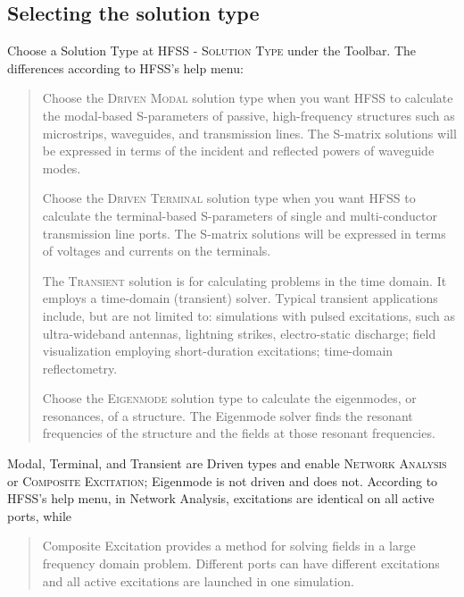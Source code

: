 \documentclass[11pt]{article}
\begin{document}

\subsection{Selecting the solution type}

Choose a Solution Type at \textsc{HFSS - Solution Type} under the Toolbar. The differences according to HFSS's help menu:

\blockquote{Choose the \textsc{Driven Modal} solution type when you want HFSS to calculate the modal-based S-parameters of passive, high-frequency structures such as microstrips, waveguides, and transmission lines. The S-matrix solutions will be expressed in terms of the incident and reflected powers of waveguide modes. 

Choose the \textsc{Driven Terminal} solution type when you want HFSS to calculate the terminal-based S-parameters of single and multi-conductor transmission line ports. The S-matrix solutions will be expressed in terms of voltages and currents on the terminals. %

The \textsc{Transient} solution is for calculating problems in the time domain. It employs a time-domain (transient) solver. Typical transient applications include, but are not limited to: simulations with pulsed excitations, such as ultra-wideband antennas, lightning strikes, electro-static discharge; field visualization employing short-duration excitations; time-domain reflectometry.

Choose the \textsc{Eigenmode} solution type to calculate the eigenmodes, or resonances, of a structure. The Eigenmode solver finds the resonant frequencies of the structure and the fields at those resonant frequencies.}

Modal, Terminal, and Transient are Driven types and enable \textsc{Network Analysis} or \textsc{Composite Excitation}; Eigenmode is not driven and does not. According to HFSS's help menu, in Network Analysis, excitations are identical on all active ports, while

\blockquote{Composite Excitation provides a method for solving fields in a large frequency domain problem. Different ports can have different excitations and all active excitations are launched in one simulation.}

\begin{comment}
Quote HFSS: {Network Analysis is the default and functions as before.
\end{comment}
\end{document}
